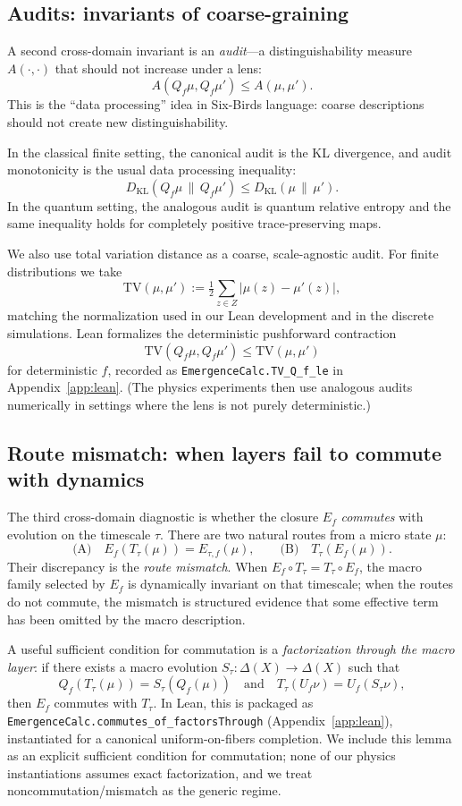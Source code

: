 \documentclass[11pt]{article}
\providecommand{\Z}{Z}
\providecommand{\X}{X}
\providecommand{\Dist}[1]{\Delta(#1)}
\providecommand{\Lens}{f}
\providecommand{\Qf}{Q_f}
\providecommand{\Uf}{U_f}
\providecommand{\Etauf}{E_{\tau,f}}
\providecommand{\DKL}[2]{D_{\mathrm{KL}}\!\left(#1\,\|\,#2\right)}
\begin{document}
\subsection{Audits: invariants of coarse-graining}
A second cross-domain invariant is an \emph{audit}---a distinguishability measure $A(\cdot,\cdot)$ that should not increase under a lens:
\[
  A(\Qf\mu,\Qf\mu') \le A(\mu,\mu').
\]
This is the ``data processing'' idea in Six-Birds language: coarse descriptions should not create new distinguishability.

In the classical finite setting, the canonical audit is the KL divergence, and audit monotonicity is the usual data processing inequality:
\[
  \DKL{\Qf\mu}{\Qf\mu'} \le \DKL{\mu}{\mu'}.
\]
In the quantum setting, the analogous audit is quantum relative entropy and the same inequality holds for completely positive trace-preserving maps.

We also use total variation distance as a coarse, scale-agnostic audit. For finite distributions we take
\[
  \mathrm{TV}(\mu,\mu') := \tfrac{1}{2}\sum_{z\in\Z}\bigl|\mu(z)-\mu'(z)\bigr|,
\]
matching the normalization used in our Lean development and in the discrete simulations.
Lean formalizes the deterministic pushforward contraction
\[
  \mathrm{TV}(\Qf\mu,\Qf\mu') \le \mathrm{TV}(\mu,\mu')
\]
for deterministic $\Lens$, recorded as \texttt{EmergenceCalc.TV\_Q\_f\_le} in Appendix~\ref{app:lean}. (The physics experiments then use analogous audits numerically in settings where the lens is not purely deterministic.)

\subsection{Route mismatch: when layers fail to commute with dynamics}
The third cross-domain diagnostic is whether the closure $E_f$ \emph{commutes} with evolution on the timescale $\tau$. There are two natural routes from a micro state $\mu$:
\[
  \text{(A)}\quad E_f(T_\tau(\mu)) = \Etauf(\mu),
  \qquad
  \text{(B)}\quad T_\tau(E_f(\mu)).
\]
Their discrepancy is the \emph{route mismatch}. When $E_f\circ T_\tau = T_\tau\circ E_f$, the macro family selected by $E_f$ is dynamically invariant on that timescale; when the routes do not commute, the mismatch is structured evidence that some effective term has been omitted by the macro description.

A useful sufficient condition for commutation is a \emph{factorization through the macro layer}: if there exists a macro evolution $S_\tau:\Dist{\X}\to\Dist{\X}$ such that
\[
  \Qf(T_\tau(\mu)) = S_\tau(\Qf(\mu))
  \quad\text{and}\quad
  T_\tau(\Uf\nu)=\Uf(S_\tau\nu),
\]
then $E_f$ commutes with $T_\tau$. In Lean, this is packaged as\\
{\small\texttt{EmergenceCalc.commutes\_of\_factorsThrough}} (Appendix~\ref{app:lean}), instantiated for a canonical uniform-on-fibers completion.
We include this lemma as an explicit sufficient condition for commutation; none of our physics instantiations assumes exact factorization, and we treat noncommutation/mismatch as the generic regime.
\end{document}
